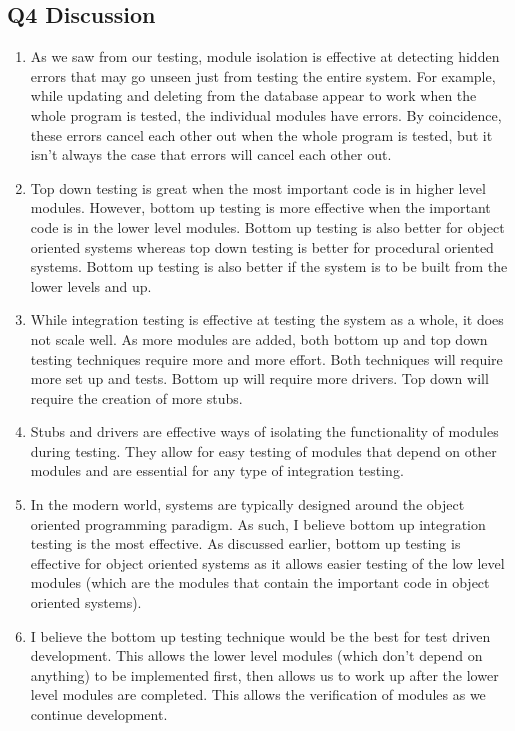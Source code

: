 \documentclass[12pt, letterpaper, titlepage]{article}
\begin{document}
\subsection*{Q4 Discussion}
\begin{enumerate}
    \item As we saw from our testing, module isolation is effective at detecting hidden errors that may go unseen just from testing the entire system. For example, while updating and deleting from the database appear to work when the whole program is tested, the individual modules have errors. By coincidence, these errors cancel each other out when the whole program is tested, but it isn't always the case that errors will cancel each other out. 
    \item Top down testing is great when the most important code is in higher level modules. However, bottom up testing is more effective when the important code is in the lower level modules. Bottom up testing is also better for object oriented systems whereas top down testing is better for procedural oriented systems. Bottom up testing is also better if the system is to be built from the lower levels and up. 
    \item While integration testing is effective at testing the system as a whole, it does not scale well. As more modules are added, both bottom up and top down testing techniques require more and more effort. Both techniques will require more set up and tests. Bottom up will require more drivers. Top down will require the creation of more stubs.
    \item Stubs and drivers are effective ways of isolating the functionality of modules during testing. They allow for easy testing of modules that depend on other modules and are essential for any type of integration testing.
    \item In the modern world, systems are typically designed around the object oriented programming paradigm. As such, I believe bottom up integration testing is the most effective. As discussed earlier, bottom up testing is effective for object oriented systems as it allows easier testing of the low level modules (which are the modules that contain the important code in object oriented systems).
    \item I believe the bottom up testing technique would be the best for test driven development. This allows the lower level modules (which don't depend on anything) to be implemented first, then allows us to work up after the lower level modules are completed. This allows the verification of modules as we continue development.

\end{enumerate}
\end{document}
